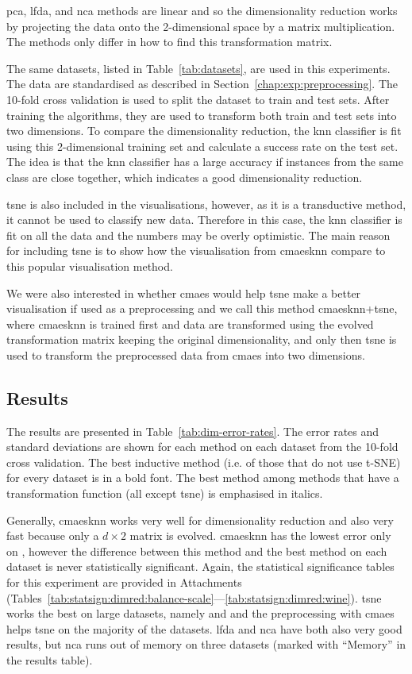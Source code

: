 \documentclass[12pt,a4paper]{report}
\begin{document}
\ac{pca}, \ac{lfda}, and \ac{nca} methods are linear and so the dimensionality reduction works by projecting the data onto the 2-dimensional space by a matrix multiplication. The methods only differ in how to find this transformation matrix.

The same datasets, listed in Table~\ref{tab:datasets}, are used in this experiments. The data are standardised as described in Section~\ref{chap:exp:preprocessing}. The 10-fold cross validation is used to split the dataset to train and test sets. After training the algorithms, they are used to transform both train and test sets into two dimensions. To compare the dimensionality reduction, the \ac{knn} classifier is fit using this 2-dimensional training set and calculate a success rate on the test set. The idea is that the \ac{knn} classifier has a large accuracy if instances from the same class are close together, which indicates a good dimensionality reduction. 

\ac{tsne} is also included in the visualisations, however, as it is a transductive method, it cannot be used to classify new data. Therefore in this case, the \ac{knn} classifier is fit on all the data and the numbers may be overly optimistic. The main reason for including \ac{tsne} is to show how the visualisation from \ac{cmaesknn} compare to this popular visualisation method.

We were also interested in whether \ac{cmaes} would help \ac{tsne} make a better visualisation if used as a preprocessing and we call this method \ac{cmaesknn}+\ac{tsne}, where \ac{cmaesknn} is trained first and data are transformed using the evolved transformation matrix keeping the original dimensionality, and only then \ac{tsne} is used to transform the preprocessed data from \ac{cmaes} into two dimensions.

\subsection{Results}

The results are presented in Table~\ref{tab:dim-error-rates}. The error rates and standard deviations are shown for each method on each dataset from the 10-fold cross validation. The best inductive method (i.e. of those that do not use t-SNE) for every dataset is in a bold font. The best method among methods that have a transformation function (all except \ac{tsne}) is emphasised in italics.

Generally, \ac{cmaesknn} works very well for dimensionality reduction and also very fast because only a $d\times2$ matrix is evolved. \ac{cmaesknn} has the lowest error only on , however the difference between this method and the best method on each dataset is never statistically significant. Again, the statistical significance tables for this experiment are provided in Attachments (Tables~\ref{tab:statsign:dimred:balance-scale}---\ref{tab:statsign:dimred:wine}). \ac{tsne} works the best on large datasets, namely  and  and the preprocessing with \ac{cmaes} helps \ac{tsne} on the majority of the datasets. \ac{lfda} and \ac{nca} have both also very good results, but \ac{nca} runs out of memory on three datasets (marked with ``Memory'' in the results table).
\end{document}
